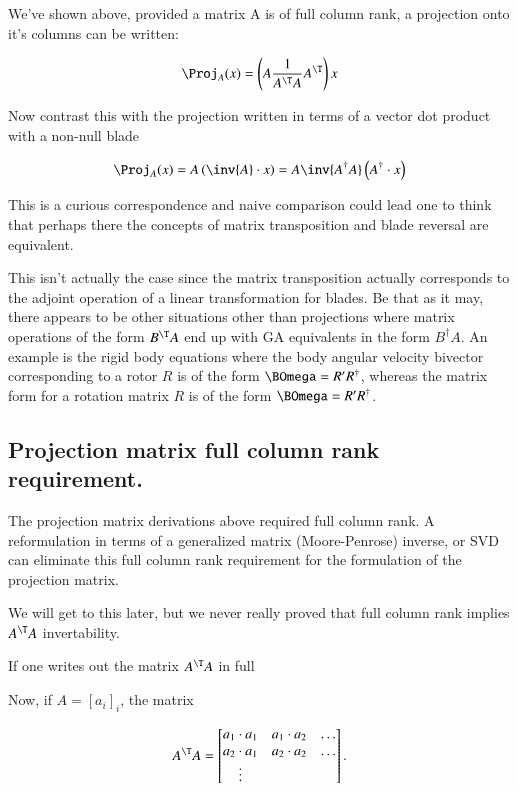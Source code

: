 We've shown above, provided a matrix A is of full column rank, a projection onto it's columns can be written:

\[
\Proj_A(x) = \left( A \frac{1}{A^\T A} A^\T \right) x
\]

Now contrast this with the projection written in terms of a vector dot product with a non-null blade 

\[
\Proj_A(x) = A \left(\inv{A} \cdot x\right) = A \inv{A^\dagger A} \left(A^\dagger \cdot x\right)
\]

This is a curious correspondence and naive comparison could lead one to think that perhaps there the concepts of matrix
transposition and blade reversal are equivalent.

This isn't actually the case since the matrix transposition actually corresponds to
the adjoint operation of a linear transformation for blades.  Be that as it may, there appears to be other situations
other than projections where matrix operations of the form $B^\T A$ end up with GA equivalents in the form $B^\dagger A$.  An example
is the rigid body equations where the body angular velocity bivector corresponding to a rotor $R$ is of the form $\BOmega = R' R^\dagger$, whereas the matrix
form for a rotation matrix $R$ is of the form $\BOmega = R' R^\dagger$.

\subsection{Projection matrix full column rank requirement. }

The projection matrix derivations above required full column rank.  A reformulation in terms
of a generalized matrix (Moore-Penrose) inverse, or SVD can eliminate this full column rank requirement for
the formulation of the projection matrix.

We will get to this later, but we never really proved that
full column rank implies $A^\T A$ invertability.

If one writes out the matrix $A^\T A$ in full

Now, if $A = [a_i]_i$, the matrix

\begin{equation}\label{eqn:projMatrixCompare:AtA}
A^\T A
=
\begin{bmatrix}
{a_1} \cdot {a_1} & {a_1} \cdot {a_2} & \hdots \\
{a_2} \cdot {a_1} & {a_2} \cdot {a_2} & \hdots \\
\vdots & & \\
\end{bmatrix}.
\end{equation}

